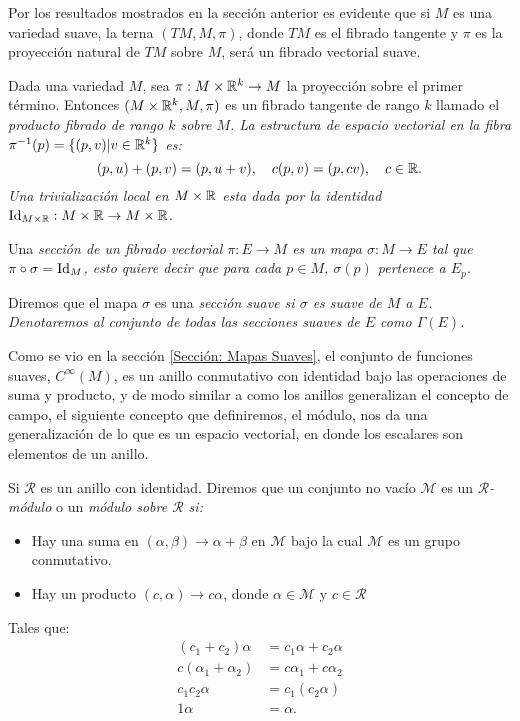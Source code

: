 \begin{example}
	Por los resultados mostrados en la sección anterior es evidente que si $M$ es una variedad suave, la terna $(TM, M, \pi)$, donde $TM$ es el fibrado tangente y $\pi$ es la proyección natural de $TM$ sobre $M$, será un fibrado vectorial suave.
\end{example}

\begin{example}
	Dada una variedad $M$, sea $\pi: M \times \mathbb{R}^{k} \to M$ la proyección sobre el primer término. Entonces $(M \times \mathbb{R}^{k}, M, \pi)$ es un fibrado tangente de rango $k$ llamado el \it{producto fibrado} de rango $k$ sobre $M$. La estructura de espacio vectorial en la fibra $\pi^{-1}(p) = \{(p,v) | v \in \mathbb{R}^{k}\}$ es:
	\[
		(p,u) + (p,v) = (p, u+v), \quad c(p,v) = (p,cv), \quad c \in \mathbb{R}.
	\]
	Una trivialización local en $M \times \mathbb{R}$ esta dada por la identidad $\mathrm{Id}_{M \times \mathbb{R}}: M \times \mathbb{R} \to  M \times \mathbb{R}$.
\end{example}

\begin{definition}
	Una \it{sección} de un fibrado vectorial $\pi: E \to M$ es un mapa $\sigma: M \to E$ tal que $\pi \circ \sigma = \mathrm{Id}_{M}$, esto quiere decir que para cada $p \in M$, $\sigma(p)$ pertenece a $E_p$.

	Diremos que el mapa $\sigma$ es una \it{sección suave} si $\sigma$ es suave de $M$ a $E$. Denotaremos al conjunto de todas las secciones suaves de $E$ como $\Gamma(E)$.
\end{definition}

Como se vio en la sección \ref{Sección: Mapas Suaves}, el conjunto de funciones suaves, $C^{\infty}(M)$, es un anillo conmutativo con identidad bajo las operaciones de suma y producto, y de modo similar a como los anillos generalizan el concepto de campo, el siguiente concepto que definiremos, el módulo, nos da una generalización de lo que es un espacio vectorial, en donde los escalares son elementos de un anillo.

\begin{definition}[Módulo]
	Si $\mathcal{R}$ es un anillo con identidad. Diremos que un conjunto no vacío $\mathcal{M}$ es un \textit{$\mathcal{R}$-módulo} o un \it{módulo sobre $\mathcal{R}$} si:
	\begin{itemize}
		\item Hay una suma en $(\alpha,\beta) \to \alpha + \beta$ en $\mathcal{M}$ bajo la cual $\mathcal{M}$ es un grupo conmutativo.
		\item Hay un producto $(c,\alpha) \to c \alpha$, donde $\alpha \in \mathcal{M}$ y $c \in \mathcal{R}$
	\end{itemize}
	Tales que:
	\begin{align*}
		(c_1 + c_2) \alpha     & = c_1 \alpha + c_2 \alpha \\
		c(\alpha_1 + \alpha_2) & = c\alpha_1 + c\alpha_2   \\
		c_1 c_2 \alpha         & = c_1(c_2 \alpha)         \\
		1 \alpha               & = \alpha.
	\end{align*}
\end{definition}


